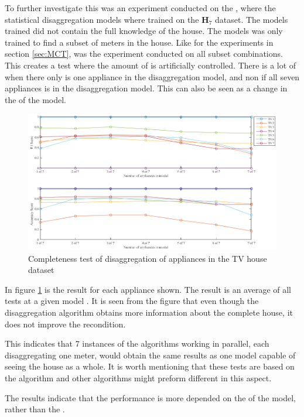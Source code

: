 To further investigate this was an experiment conducted on the , where the statistical disaggregation models where trained on the $\textbf{H}_{7}$ dataset. The models trained did not contain the full knowledge of the house. The models was only trained to find a subset of meters in the house. Like for the experiments in section \ref{sec:MCT}, was the experiment conducted on all subset combinations. This creates a test where the amount of  is artificially controlled. There is a lot of  when there only is one appliance in the disaggregation model, and non if all seven appliances is in the disaggregation model. This can also be seen as a change in the  of the model. 

\begin{figure}[H]
\centering
\includegraphics[width=1\textwidth]{billeder/ModelCompletness.png}
\caption{Completeness test of disaggregation of appliances in the TV house dataset }
\label{fig:COD}
\end{figure}

In figure \ref{fig:COD} is the result for each appliance shown. The result is an average of all tests at a given model . It is seen from the figure that even though the disaggregation algorithm obtains more information about the complete house, it does not improve the recondition. 

This indicates that 7 instances of the algorithms working in parallel, each disaggregating one meter, would obtain the same results as one model capable of seeing the house as a whole. It is worth mentioning that these tests are based on the  algorithm and other algorithms might preform different in this aspect. 

The results indicate that the performance is more depended on the  of the model, rather than the .

